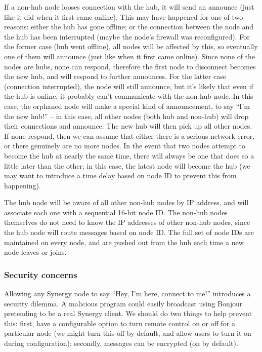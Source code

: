 If a non-hub node looses connection with the hub, it will send an announce (just
like it did when it first came online). This may have happened for one of two
reasons: either the hub has gone offline; or the connection between the node
and the hub has been interrupted (maybe the node's firewall was reconfigured).
For the former case (hub went offline), all nodes will be affected by this, so
eventually one of them will announce (just like when it first came online).
Since none of the nodes are hubs, none can respond, therefore the first node
to disconnect becomes the new hub, and will respond to further announces.
For the latter case (connection interrupted), the node will still announce,
but it's likely that even if the hub is online, it probably can't communicate
with the non-hub node. In this case, the orphaned node will make a special
kind of announcement, to say ``I'm the new hub!'' -- in this case, all other
nodes (both hub and non-hub) will drop their connections and announce. The
new hub will then pick up all other nodes. If none respond, then we can assume
that either there is a serious network error, or there genuinely are no more
nodes. In the event that two nodes attempt to become the hub at nearly the same
time, there will always be one that does so a little later than the other; in
this case, the latest node will become the hub (we may want to introduce a time
delay based on node ID to prevent this from happening).

The hub node will be aware of all other non-hub nodes by IP address, and will
associate each one with a sequential 16-bit node ID. The non-hub nodes themselves
do not need to know the IP addresses of other non-hub nodes, since the hub node
will route messages based on node ID. The full set of node IDs are maintained
on every node, and are pushed out from the hub each time a new node leaves or
joins.

\subsubsection{Security concerns}

Allowing any Synergy node to say ``Hey, I'm here, connect to me!'' introduces
a security dilemma. A malicious program could easily broadcast using Bonjour
pretending to be a real Synergy client. We should do two things to help prevent
this: first, have a configurable option to turn remote control on or off for
a particular node (we might turn this off by default, and allow users to turn
it on during configuration); secondly, messages can be encrypted (on by 
default).


